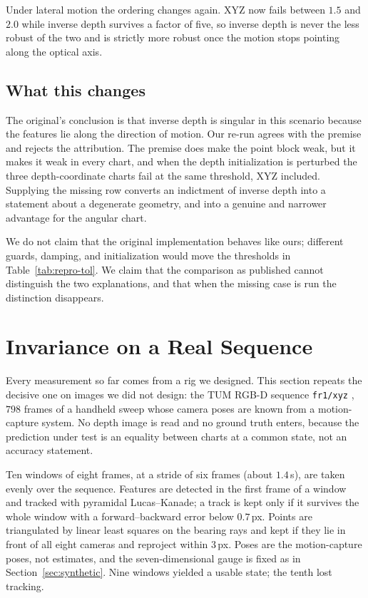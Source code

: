 \documentclass[11pt,a4paper]{article}
\let\cite\citep
\theoremstyle{definition}
\theoremstyle{remark}
\begin{document}
Under lateral motion the ordering changes again. XYZ now fails between $1.5$ and $2.0$ while inverse depth survives a factor of five, so inverse depth is never the less robust of the two and is strictly more robust once the motion stops pointing along the optical axis.

\subsection{What this changes}
The original's conclusion is that inverse depth is singular in this scenario because the features lie along the direction of motion. Our re-run agrees with the premise and rejects the attribution. The premise does make the point block weak, but it makes it weak in every chart, and when the depth initialization is perturbed the three depth-coordinate charts fail at the same threshold, XYZ included. Supplying the missing row converts an indictment of inverse depth into a statement about a degenerate geometry, and into a genuine and narrower advantage for the angular chart.

We do not claim that the original implementation behaves like ours; different guards, damping, and initialization would move the thresholds in Table~\ref{tab:repro-tol}. We claim that the comparison as published cannot distinguish the two explanations, and that when the missing case is run the distinction disappears.

\section{Invariance on a Real Sequence}
\label{sec:real}

Every measurement so far comes from a rig we designed. This section repeats the decisive one on images we did not design: the TUM RGB-D sequence \texttt{fr1/xyz} \cite{sturm2012benchmark}, $798$ frames of a handheld sweep whose camera poses are known from a motion-capture system. No depth image is read and no ground truth enters, because the prediction under test is an equality between charts at a common state, not an accuracy statement.

Ten windows of eight frames, at a stride of six frames (about $1.4$\,s), are taken evenly over the sequence. Features are detected in the first frame of a window and tracked with pyramidal Lucas--Kanade; a track is kept only if it survives the whole window with a forward--backward error below $0.7$\,px. Points are triangulated by linear least squares on the bearing rays and kept if they lie in front of all eight cameras and reproject within $3$\,px. Poses are the motion-capture poses, not estimates, and the seven-dimensional gauge is fixed as in Section~\ref{sec:synthetic}. Nine windows yielded a usable state; the tenth lost tracking.
\end{document}
